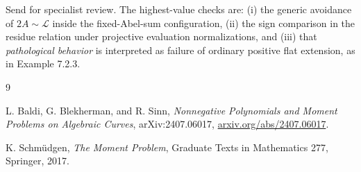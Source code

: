 \documentclass[11pt]{article}
\newcommand{\cL}{\mathcal{L}}
\begin{document}
Send for specialist review. The highest-value checks are:
(i) the generic avoidance of $2A\sim\cL$ inside the fixed-Abel-sum
configuration, (ii) the sign comparison in the residue relation under
projective evaluation normalizations, and (iii) that
\emph{pathological behavior} is interpreted as failure of ordinary
positive flat extension, as in Example 7.2.3.

\begin{thebibliography}{9}

L. Baldi, G. Blekherman, and R. Sinn,
\emph{Nonnegative Polynomials and Moment Problems on Algebraic Curves},
arXiv:2407.06017,
\href{https://arxiv.org/abs/2407.06017}{arxiv.org/abs/2407.06017}.

K. Schm\"udgen,
\emph{The Moment Problem},
Graduate Texts in Mathematics 277, Springer, 2017.

\end{thebibliography}
\end{document}
